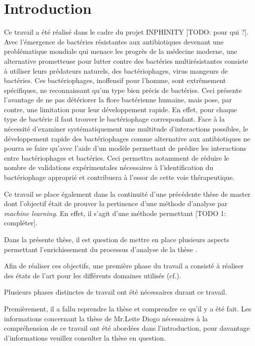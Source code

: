 \chapter{Introduction}
\label{ch:introduction}

Ce travail a été réalisé dans le cadre du projet INPHINITY [TODO: pour qui ?]. Avec l'émergence de bactéries résistantes aux antibiotiques devenant une problématique mondiale qui menace les progrès de la médecine moderne, une alternative prometteuse pour lutter contre des bactéries multirésistantes consiste à utiliser leurs prédateurs naturels, des bactériophages, virus mangeurs de bactéries. Ces bactériophages, inoffensif pour l'homme, sont extrêmement spécifiques, ne reconnaissant qu'un type bien précis de bactéries. Ceci présente l'avantage de ne pas détériorer la flore bactérienne humaine, mais pose, par contre, une limitation pour leur développement rapide. En effet, pour chaque type de bactérie il faut trouver le bactériophage correspondant. Face à la nécessité d'examiner systématiquement une multitude d'interactions possibles, le développement rapide des bactériophages comme alternative aux antibiotiques ne pourra se faire qu'avec l'aide d'un modèle permettant de prédire les interactions entre bactériophages et bactéries. Ceci permettra notamment de réduire le nombre de validations expérimentales nécessaires à l'identification du bactériophage approprié et contribuera à l'essor de cette voie thérapeutique.

Ce travail se place également dans la continuité d'une précédente thèse de master dont l'objectif était de prouver la pertinence d'une méthode d'analyse par \emph{machine learning}. En effet, il s'agit d'une méthode permettant [TODO 1: compléter].

Dans la présente thèse, il est question de mettre en place plusieurs aspects permettant l'enrichissement du processus d'analyse de la thèse \thLeite. 

Afin de réaliser ces objectifs, une première phase du travail a consisté à réaliser des états de l'art pour les différents domaines utilisés (cf.).

Plusieurs phases distinctes de travail ont été nécessaires durant ce travail.

Premièrement, il a fallu reprendre la thèse \thLeite et comprendre ce qu'il y a été fait. Les informations concernant la thèse de Mr.Leite Diogo nécessaires à la compréhension de ce travail ont été abordées dans l'introduction, pour davantage d'informations veuillez consulter la thèse en question.

